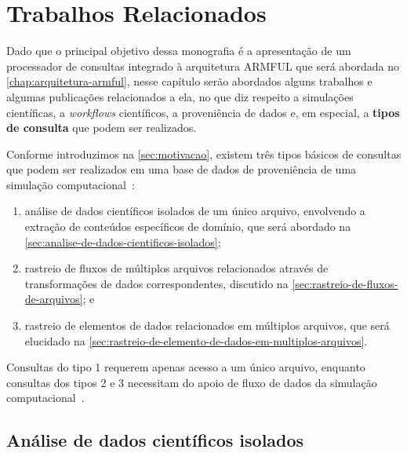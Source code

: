 
\chapter{Trabalhos Relacionados}%
\label{chap:trabalhos-relacionados}

Dado que o principal objetivo dessa monografia é a apresentação de um processador de consultas integrado à arquitetura ARMFUL que será abordada no \autoref{chap:arquitetura-armful}, nesse capítulo serão abordados alguns trabalhos e algumas publicações relacionados a ela, no que diz respeito a simulações científicas, a \textit{workflows} científicos, a proveniência de dados e, em especial, a \textbf{tipos de consulta} que podem ser realizados.

Conforme introduzimos na \autoref{sec:motivacao}, existem três tipos básicos de consultas que podem ser realizados em uma base de dados de proveniência de uma simulação computacional~\cite{silva2015analyzing,silva2015propostadoutorado}:

\begin{enumerate}
    \item análise de dados científicos isolados de um único arquivo, envolvendo a extração de conteúdos específicos de domínio, que será abordado na \autoref{sec:analise-de-dados-cientificos-isolados};
    \item rastreio de fluxos de múltiplos arquivos relacionados através de transformações de dados correspondentes, discutido na \autoref{sec:rastreio-de-fluxos-de-arquivos}; e
    \item rastreio de elementos de dados relacionados em múltiplos arquivos, que será elucidado na \autoref{sec:rastreio-de-elemento-de-dados-em-multiplos-arquivos}.
\end{enumerate}

Consultas do tipo 1 requerem apenas acesso a um único arquivo, enquanto consultas dos tipos 2 e 3 necessitam do apoio de fluxo de dados da simulação computacional~\cite{silva2015analyzing}.

\section{Análise de dados científicos isolados}%
\label{sec:analise-de-dados-cientificos-isolados}

